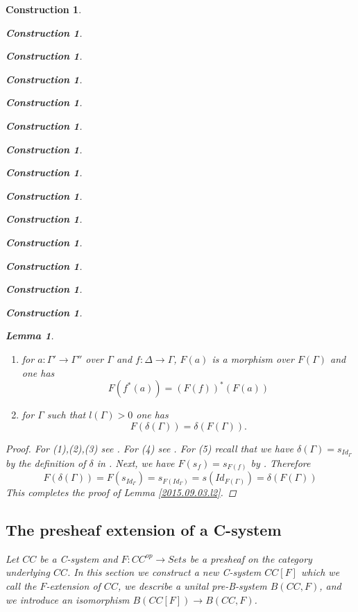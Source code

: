 \documentclass[12pt]{amsart}
\newtheorem{lemma}[proposition]{Lemma}
\numberwithin{proposition}{subsection}
\newtheorem{construction}[proposition]{Construction}
\newcommand{\llabel}[1]{\label{#1}}
\newcommand{\sr}{\rightarrow}
\begin{document}
\begin{construction}
\begin{construction}
\begin{construction}
\begin{construction}
\begin{construction}
\begin{construction}
\begin{construction}
\begin{construction}
\begin{construction}
\begin{construction}
\begin{construction}
\begin{construction}
\begin{construction}
\begin{construction}
\begin{lemma}
\begin{enumerate}
\begin{equation*}
\begin{split}
      F(q(f,\Gamma'))&=q(F(f),F(\Gamma'))
    \end{split}
  \end{equation*}
\item for $a:\Gamma'\sr \Gamma''$ over $\Gamma$ and $f:\Delta\sr \Gamma$, $F(a)$ is a morphism over $F(\Gamma)$ and one has
%
$$F(f^*(a))=(F(f))^*(F(a))$$
%
\item for $\Gamma$ such that $l(\Gamma)>0$ one has
%
$$F(\delta(\Gamma))=\delta(F(\Gamma)).$$
%
\end{enumerate}
\end{lemma}
%
\begin{proof}
For (1),(2),(3) see \cite[Lemma 2.5]{fromunivwithPiI}. For (4) see \cite[Lemma
  2.14]{fromunivwithPiI}. For (5) recall that we have
$\delta(\Gamma)=s_{Id_{\Gamma}}$ by the definition of $\delta$ in
\cite[p.~131]{Csubsystems}. Next, we have $F(s_f)=s_{F(f)}$ by \cite[Lemma
  3.4]{Cfromauniverse}. Therefore
%
$$F(\delta(\Gamma))=F(s_{Id_{\Gamma}})=s_{F(Id_{\Gamma})}=s(Id_{F(\Gamma)})=\delta(F(\Gamma))$$
%
This completes the proof of Lemma \ref{2015.09.03.l2}.  
\end{proof}
%
\subsection{The presheaf extension of a C-system}
\llabel{Fext}
%
Let $CC$ be a C-system and $F:CC^{op}\sr Sets$ be a presheaf on the category
underlying $CC$. In this section we construct a new C-system $CC[F]$ which we
call the {\em $F$-extension of $CC$}, we describe a unital pre-B-system $B(CC,F)$, and we introduce
an isomorphism $B(CC[F])\sr B(CC,F)$.


\end{construction}
\end{construction}
\end{construction}
\end{construction}
\end{construction}
\end{construction}
\end{construction}
\end{construction}
\end{construction}
\end{construction}
\end{construction}
\end{construction}
\end{construction}
\end{construction}
\end{document}
